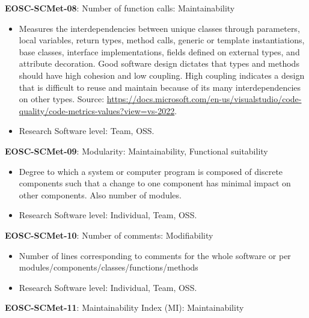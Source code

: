 \textbf{EOSC-SCMet-08}: Number of function calls: Maintainability

\begin{itemize}
    \item Measures the interdependencies between unique classes through parameters, local variables, return types, method calls, generic or template instantiations, base classes, interface implementations, fields defined on external types, and attribute decoration. Good software design dictates that types and methods should have high cohesion and low coupling. High coupling indicates a design that is difficult to reuse and maintain because of its many interdependencies on other types. Source: \url{https://docs.microsoft.com/en-us/visualstudio/code-quality/code-metrics-values?view=vs-2022}. \cite{montagud_systematic_2012,ogasawara_experiences_1996}
    \item Research Software level: Team, OSS.
\end{itemize}

\textbf{EOSC-SCMet-09}: Modularity: Maintainability, Functional suitability

\begin{itemize}
    \item Degree to which a system or computer program is composed of discrete components such that a change to
one component has minimal impact on other components. Also number of modules. \cite{iso_25010_2011_2017,montagud_systematic_2012,aberdour_achieving_2007,ogasawara_experiences_1996,shepherdson_cessda_2019}
    \item Research Software level: Individual, Team, OSS.
\end{itemize}

\textbf{EOSC-SCMet-10}: Number of comments: Modifiability

\begin{itemize}
    \item Number of lines corresponding to comments for the whole software or per modules/components/classes/functions/methods \cite{srisopha_software_2018,montagud_systematic_2012,ogasawara_experiences_1996}
    \item Research Software level: Individual, Team, OSS.
\end{itemize}

\textbf{EOSC-SCMet-11}: Maintainability Index (MI): Maintainability

